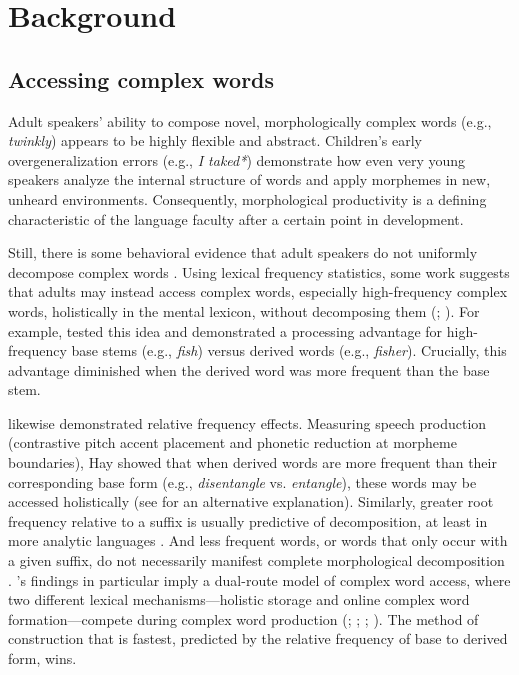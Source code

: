 \documentclass[a4paper,man,floatsintext,natbib,donotrepeattitle, apacite]{apa6}
\begin{document}
\section{Background}

\subsection{Accessing complex words}

Adult speakers’ ability to compose novel, morphologically complex words (e.g., \textit{twinkly}) appears to be highly flexible and abstract. Children’s early overgeneralization errors (e.g., \textit{I taked*}) demonstrate how even very young speakers analyze the internal structure of words and apply morphemes in new, unheard environments. Consequently, morphological productivity is a defining characteristic of the language faculty after a certain point in development. 

Still, there is some behavioral evidence that adult speakers do not uniformly decompose complex words \citep{taftLexicalStorageRetrieval1976}. 
Using lexical frequency statistics, some work suggests that adults may instead access complex words, especially high-frequency complex words, holistically in the mental lexicon, without decomposing them (\citealt{baayenQuantitativeAspectsMorphological1992}; \citealt{baayenFrequencyEffectsRegular2003}). For example, \citet{coleWordsMorphemesUnits1997} tested this idea and demonstrated a processing advantage for high-frequency base stems (e.g., \textit{fish}) versus derived words (e.g., \textit{fisher}). Crucially, this advantage diminished when the derived word was more frequent than the base stem. 

\citet{hayCausesConsequencesWord2003} likewise demonstrated relative frequency effects. Measuring speech production (contrastive pitch accent placement and phonetic reduction at morpheme boundaries), Hay showed that when derived words are more frequent than their corresponding base form (e.g., \textit{disentangle} vs. \textit{entangle}), these words may be accessed holistically (see \citealt{pluymaekersMorphologicalEffectsFine2010} for an alternative explanation). Similarly, greater root frequency relative to a suffix is usually predictive of decomposition, at least in more analytic languages \citep{smithPhoneticDetailThat2012}. And less frequent words, or words that only occur with a given suffix, do not necessarily manifest complete morphological decomposition \citep{kempsProsodicCuesMorphological2005}. 
\citet{hayCausesConsequencesWord2003}'s findings in particular imply a dual-route model of complex word access, where two different lexical mechanisms---holistic storage and online complex word formation---compete during complex word production (\citealt{baayenQuantitativeAspectsMorphological1992}; \citealt{koenigTypeUnderspecificationOnline1995}; \citealt{pinkerRegularIrregularMorphology1994}; \citealt{pinkerFutureTense2002}). The method of construction that is fastest, predicted by the relative frequency of base to derived form, wins. 
\end{document}
